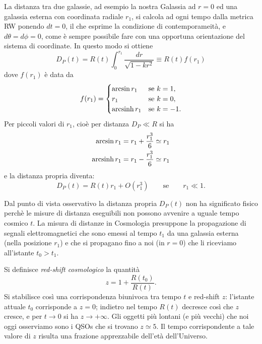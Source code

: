 La distanza tra due galassie, ad esempio la nostra Galassia ad $r=0$ ed una
galassia esterna con coordinata radiale $r_1$, si calcola ad ogni tempo dalla
metrica RW ponendo $dt=0$, il che esprime la condizione di contemporameità, e $d
\theta = d \phi =0$, come è sempre possibile fare con una opportuna orientazione
del sistema di coordinate.  In questo modo si ottiene
\begin{equation}
  D_P(t) = R(t) \int_0^{r_1} \frac{dr}{\sqrt{1-kr^2}} \equiv R(t) f(r_1)
  \label{dprop}
\end{equation}
dove $f(r_1)$ è data da
\begin{equation}
  f(r_{1}) =
  \begin{cases}
    \arcsin r_{1}  & \text{se } k = 1, \\
    r_{1}        & \text{se } k = 0, \\
    \operatorname{arcsinh} r_{1} & \text{se } k = -1.
  \end{cases}
\end{equation}
Per piccoli valori di $r_1$, cioè per distanza $D_P \ll R$ si ha
\begin{subequations}
  \begin{align}
    \arcsin r_1 &= r_1 +\frac{r_1^3}{6}  \simeq r_1 \\
    \operatorname{arcsinh} r_1 &= r_1 -\frac{r_1^3}{6}  \simeq r_1
  \end{align}
\end{subequations}
e la distanza propria diventa:
\begin{equation}
  D_P(t) = R(t) r_1 + O(r_1^3) \qquad\text{se}\qquad r_1 \ll 1.
\end{equation}

Dal punto di vista osservativo la distanza propria $D_P(t)$ non ha significato
fisico perchè le misure di distanza eseguibili non possono avvenire a uguale
tempo cosmico $t$.  La misura di distanze in Cosmologia presuppone la
propagazione di segnali elettromagnetici che sono emessi al tempo $t_1$ da una
galassia esterna (nella posizione $r_1$) e che si propagano fino a noi (in
$r=0$) che li riceviamo all'istante $t_0>t_1$.

Si definisce \emph{red-shift cosmologico} la quantità
\begin{equation}
  z = 1 + \frac{R(t_0)}{R(t)}.
\end{equation}
Si stabilisce così una corrispondenza biunivoca tra tempo $t$ e red-shift $z$:
l'istante attuale $t_0$ corrisponde a $z=0$; indietro nel tempo $R(t)$ decresce
così che $z$ cresce, e per $t \to 0$ si ha $z \to +\infty$.  Gli oggetti più
lontani (e più vecchi) che noi oggi osserviamo sono i QSOs che si trovano $z
\simeq 5$.  Il tempo corrispondente a tale valore di $z$ risulta una frazione
apprezzabile dell'età dell'Universo.

